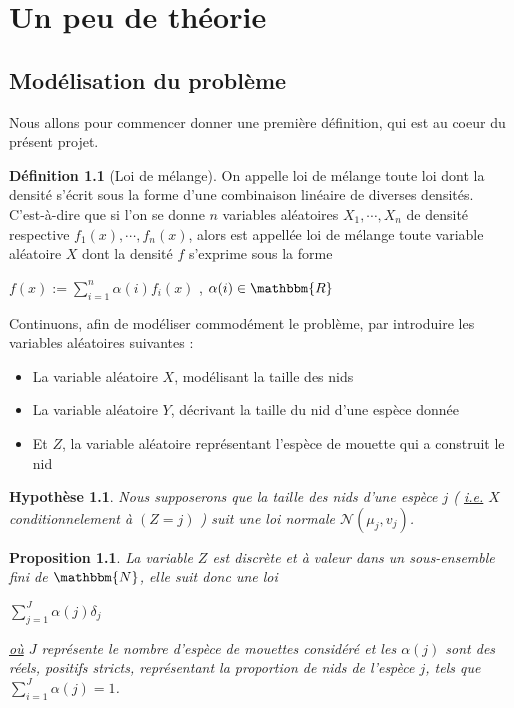 \documentclass[frenchb]{report}
\newcommand{\R}{\mathbbm{R}}
\newcommand{\N}{\mathbbm{N}}
\newcommand{\1}{\mathbbm{1}}
\newcommand{\n}{\mathcal{N}}
\newtheorem{prop}{Proposition}
\newtheorem{hyp}{Hypothèse}
\theoremstyle{definition}\newtheorem{defn}{Définition}
\theoremstyle{definition}\newtheorem{exm}{Exemple}
\theoremstyle{definition}\newtheorem{nota}{Notation}
\theoremstyle{definition}\newtheorem{rem}{Remarque}
\begin{document}
\pagebreak


\chapter{Un peu de théorie}

\section{Modélisation du problème}

Nous allons pour commencer donner une première définition, qui est au coeur du présent projet.

\begin{defn}[Loi de mélange]
On appelle loi de mélange toute loi dont la densité s'écrit sous la forme d'une combinaison linéaire de diverses densités. C'est-à-dire que si l'on se donne $n$ variables aléatoires $X_1, \cdots, X_n$ de densité respective $f_1(x), \cdots, f_n(x)$, alors est appellée loi de mélange toute variable aléatoire $X$ dont la densité $f$ s'exprime sous la forme
\begin{center} $f(x) := \displaystyle\sum_{i=1}^n \alpha(i) f_i(x)$ , $\alpha(i) \in\R$ \end{center}

\end{defn}

Continuons, afin de modéliser commodément le problème, par introduire les variables aléatoires suivantes :

\begin{itemize}[label=\adfflowerleft]
	\item La variable aléatoire $X$, modélisant la taille des nids
	\item La variable aléatoire $Y$, décrivant la taille du nid d'une espèce donnée
	\item Et $Z$, la variable aléatoire représentant l'espèce de mouette qui a construit le nid
\end{itemize}

\begin{hyp}
Nous supposerons que la taille des nids d'une espèce $j$ ( \underline{i.e.} $X$ conditionnelement à $(Z=j)$ ) suit une loi normale $\n(\mu_j,v_j)$. 
\end{hyp}

\begin{prop}
La variable $Z$ est discrète et à valeur dans un sous-ensemble fini de $\N$, elle suit donc une loi 
\begin{center} $\displaystyle \sum_{j=1}^J \alpha(j)\delta_j$ \end{center}
\underline{où} $J$ représente le nombre d'espèce de mouettes considéré et les $\alpha(j)$ sont des réels, positifs stricts, représentant la proportion de nids de l'espèce $j$, tels que $\displaystyle\sum_{i=1}^J \alpha(j) = 1$.
\end{prop}
\end{document}
